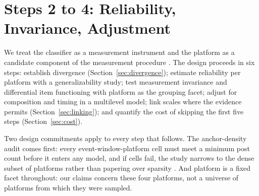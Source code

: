 
\section{Steps 2 to 4: Reliability, Invariance, Adjustment}
\label{sec:framework}

We treat the classifier as a measurement instrument and the platform as a candidate component of the measurement procedure \citep{jacobs2021, halterman2025}. The design proceeds in six steps: establish divergence (Section~\ref{sec:divergence}); estimate reliability per platform with a generalizability study; test measurement invariance and differential item functioning with platform as the grouping facet; adjust for composition and timing in a multilevel model; link scales where the evidence permits (Section~\ref{sec:linking}); and quantify the cost of skipping the first five steps (Section~\ref{sec:cost}). 

Two design commitments apply to every step that follows. The anchor-density audit comes first: every event-window-platform cell must meet a minimum post count before it enters any model, and if cells fail, the study narrows to the dense subset of platforms rather than papering over sparsity \citep{morstatter2013}. And platform is a fixed facet throughout: our claims concern these four platforms, not a universe of platforms from which they were sampled.

